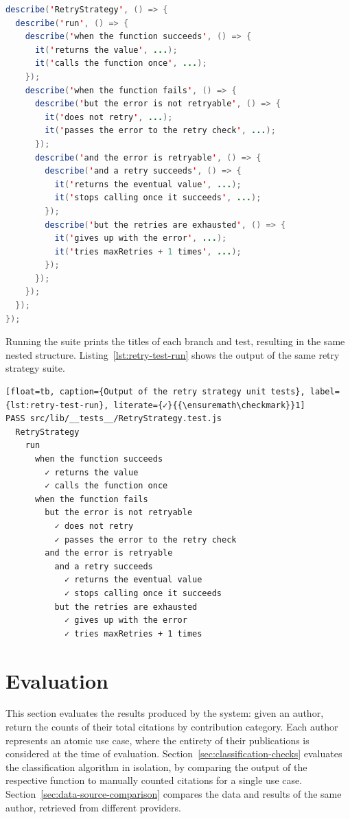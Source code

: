 \begin{lstlisting}[float=tb, language=Java, caption={Structure of the retry strategy unit test suite}, label={lst:retry-tests}]
describe('RetryStrategy', () => {
  describe('run', () => {
    describe('when the function succeeds', () => {
      it('returns the value', ...);
      it('calls the function once', ...);
    });
    describe('when the function fails', () => {
      describe('but the error is not retryable', () => {
        it('does not retry', ...);
        it('passes the error to the retry check', ...);
      });
      describe('and the error is retryable', () => {
        describe('and a retry succeeds', () => {
          it('returns the eventual value', ...);
          it('stops calling once it succeeds', ...);
        });
        describe('but the retries are exhausted', () => {
          it('gives up with the error', ...);
          it('tries maxRetries + 1 times', ...);
        });
      });
    });
  });
});
\end{lstlisting}

Running the suite prints the titles of each branch and test, resulting in the same nested structure.
Listing~\ref{lst:retry-test-run} shows the output of the same retry strategy suite.

\begin{lstlisting}[float=tb, caption={Output of the retry strategy unit tests}, label={lst:retry-test-run}, literate={✓}{{\ensuremath\checkmark}}1]
PASS src/lib/__tests__/RetryStrategy.test.js
  RetryStrategy
    run
      when the function succeeds
        ✓ returns the value
        ✓ calls the function once
      when the function fails
        but the error is not retryable
          ✓ does not retry
          ✓ passes the error to the retry check
        and the error is retryable
          and a retry succeeds
            ✓ returns the eventual value
            ✓ stops calling once it succeeds
          but the retries are exhausted
            ✓ gives up with the error
            ✓ tries maxRetries + 1 times
\end{lstlisting}


\section{Evaluation} \label{sec:evaluation}

This section evaluates the results produced by the system: given an author, return the counts of their total citations by contribution category.
Each author represents an atomic use case, where the entirety of their publications is considered at the time of evaluation.
Section~\ref{sec:classification-checks} evaluates the classification algorithm in isolation, by comparing the output of the respective function to manually counted citations for a single use case.
Section~\ref{sec:data-source-comparison} compares the data and results of the same author, retrieved from different providers.

